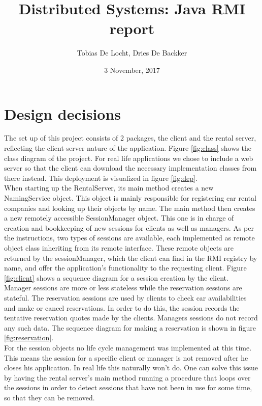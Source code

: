 \documentclass[]{article}
\title{Distributed Systems: Java RMI report}
\author{Tobias De Locht, Dries De Backker}
\date{3 November, 2017}
\begin{document}
\maketitle

\section{Design decisions}
The set up of this project consists of 2 packages, the client and the rental server, reflecting the client-server nature of the application. Figure \ref{fig:class} shows the class diagram of the project. For real life applications we chose to include a web server so that the client can download the necessary implementation classes from there instead. This deployment is visualized in figure \ref{fig:dep}.
\\
When starting up the RentalServer, its main method creates a new NamingService object. This object is mainly responsible for registering car rental companies and looking up their objects by name. The main method then creates a new remotely accessible SessionManager object. This one is in charge of creation and bookkeeping of new sessions for clients as well as managers. As per the instructions, two types of sessions are available, each implemented as remote object class inheriting from its remote interface. These remote objects are returned by the sessionManager, which the client can find in the RMI registry by name, and offer the application's functionality to the requesting client. Figure \ref{fig:client} shows a sequence diagram for a session creation by the client.
\\
Manager sessions are more or less stateless while the reservation sessions are stateful. The reservation sessions are used by clients to check car availabilities and make or cancel reservations. In order to do this, the session records the tentative reservation quotes made by the clients. Managers sessions do not record any such data. The sequence diagram for making a reservation is shown in figure \ref{fig:reservation}.
\\
For the session objects no life cycle management was implemented at this time. This means the session for a specific client or manager is not removed after he closes his application. In real life this naturally won't do. One can solve this issue by having the rental server's main method running a procedure that loops over the sessions in order to detect sessions that have not been in use for some time, so that they can be removed.
 
\end{document}
